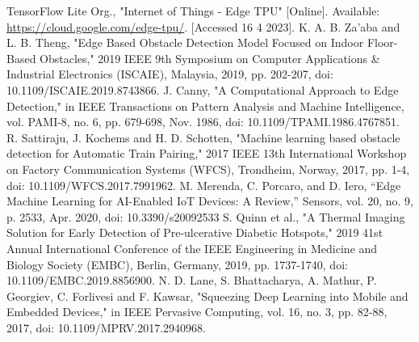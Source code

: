 \documentclass[conference]{IEEEtran}
\begin{document}
\begin{thebibliography}{00}
 TensorFlow Lite Org., "Internet of Things - Edge TPU" [Online]. Available: \url{https://cloud.google.com/edge-tpu/}. [Accessed 16 4 2023].
 K. A. B. Za’aba and L. B. Theng, "Edge Based Obstacle Detection Model Focused on Indoor Floor-Based Obstacles," 2019 IEEE 9th Symposium on Computer Applications \& Industrial Electronics (ISCAIE), Malaysia, 2019, pp. 202-207, doi: 10.1109/ISCAIE.2019.8743866.
 J. Canny, "A Computational Approach to Edge Detection," in IEEE Transactions on Pattern Analysis and Machine Intelligence, vol. PAMI-8, no. 6, pp. 679-698, Nov. 1986, doi: 10.1109/TPAMI.1986.4767851.
 R. Sattiraju, J. Kochems and H. D. Schotten, "Machine learning based obstacle detection for Automatic Train Pairing," 2017 IEEE 13th International Workshop on Factory Communication Systems (WFCS), Trondheim, Norway, 2017, pp. 1-4, doi: 10.1109/WFCS.2017.7991962.
 M. Merenda, C. Porcaro, and D. Iero, “Edge Machine Learning for AI-Enabled IoT Devices: A Review,” Sensors, vol. 20, no. 9, p. 2533, Apr. 2020, doi: 10.3390/s20092533
 S. Quinn et al., "A Thermal Imaging Solution for Early Detection of Pre-ulcerative Diabetic Hotspots," 2019 41st Annual International Conference of the IEEE Engineering in Medicine and Biology Society (EMBC), Berlin, Germany, 2019, pp. 1737-1740, doi: 10.1109/EMBC.2019.8856900.
 N. D. Lane, S. Bhattacharya, A. Mathur, P. Georgiev, C. Forlivesi and F. Kawsar, "Squeezing Deep Learning into Mobile and Embedded Devices," in IEEE Pervasive Computing, vol. 16, no. 3, pp. 82-88, 2017, doi: 10.1109/MPRV.2017.2940968.
\end{thebibliography}
\vspace{12pt}
\end{document}
